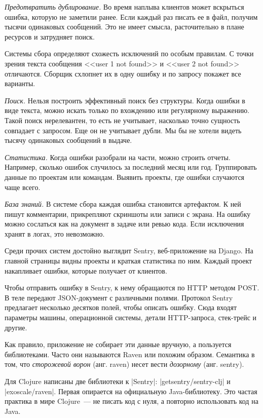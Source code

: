 \emph{Предотвратить дублирование.} Во время наплыва клиентов может вскрыться
ошибка, которую не заметили ранее. Если каждый раз писать ее в файл, получим
тысячи одинаковых сообщений. Это не имеет смысла, расточительно в плане ресурсов
и затрудняет поиск.

Системы сбора определяют схожесть исключений по особым правилам. С точки зрения
текста сообщения <<user 1 not found>> и <<user 2 not found>> отличаются. Сборщик
схлопнет их в одну ошибку и по запросу покажет все варианты.

\emph{Поиск.} Нельзя построить эффективный поиск без структуры. Когда ошибки в
виде текста, можно искать только по вхождению или регулярному выражению. Такой
поиск нерелевантен, то есть не учитывает, насколько точно сущность совпадает с
запросом. Еще он не учитывает дубли. Мы бы не хотели видеть тысячу одинаковых
сообщений в выдаче.

\emph{Статистика.} Когда ошибки разобрали на части, можно строить
отчеты. Например, сколько ошибок случилось за последний месяц или
год. Группировать данные по проектам или командам. Выявить проекты, где ошибки
случаются чаще всего.

\emph{База знаний.} В системе сбора каждая ошибка становится артефактом. К ней
пишут комментарии, прикрепляют скриншоты или записи с экрана. На ошибку можно
сослаться как на документ в задаче или ревью кода. Если исключения хранят в
логах, это невозможно.

Среди прочих систем достойно выглядит Sentry, веб-приложение на Django. На
главной страницы видны проекты и краткая статистика по ним. Каждый проект
накапливает ошибки, которые получает от клиентов.

Чтобы отправить ошибку в Sentry, к нему обращаются по HTTP методом POST. В теле
передают JSON-документ с различными полями. Протокол Sentry предлагает несколько
десятков полей, чтобы описать ошибку. Сюда входят параметры машины, операционной
системы, детали HTTP-запроса, стек-трейс и другие.

Как правило, приложение не собирает эти данные вручную, а пользуется
библиотеками. Часто они называются Raven или похожим образом. Семантика в том,
что \emph{сторожевой ворон} (анг. raven) несет вести \emph{дозорному}
(анг. sentry).

Для Clojure написаны две библиотеки к \spverb|Sentry|:
\spverb|getsentry/sentry-clj| и
\spverb|exoscale/raven|. Первая опирается на
официальную Java-библиотеку. Это частая практика в мире Clojure~--- не писать
код с нуля, а повторно использовать код на Java.

